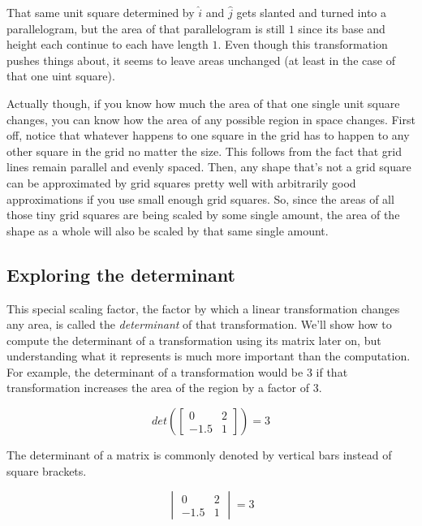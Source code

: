 That same unit square determined by $\hat{i}$ and $\hat{j}$ gets slanted and
turned into a parallelogram, but the area of that parallelogram is still $1$
since its base and height each continue to each have length $1$. Even though
this transformation pushes things about, it seems to leave areas unchanged (at
least in the case of that one uint square).

Actually though, if you know how much the area of that one single unit square
changes, you can know how the area of any possible region in space changes.
First off, notice that whatever happens to one square in the grid has to happen
to any other square in the grid no matter the size. This follows from the fact
that grid lines remain parallel and evenly spaced. Then, any shape that's not a
grid square can be approximated by grid squares pretty well with arbitrarily
good approximations if you use small enough grid squares. So, since the areas of
all those tiny grid squares are being scaled by some single amount, the area of
the shape as a whole will also be scaled by that same single amount.

\subsection{Exploring the determinant}

This special scaling factor, the factor by which a linear transformation changes
any area, is called the \textit{determinant} of that transformation. We'll show
how to compute the determinant of a transformation using its matrix later on,
but understanding what it represents is much more important than the
computation. For example, the determinant of a transformation would be $3$ if
that transformation increases the area of the region by a factor of $3$.

\begin{equation*}
  det\left(\begin{bmatrix}
    0 & 2 \\
    -1.5 & 1
  \end{bmatrix}\right) = 3
\end{equation*}

The determinant of a matrix is commonly denoted by vertical bars instead of
square brackets.

\begin{equation*}
  \begin{vmatrix}
    0 & 2 \\
    -1.5 & 1
  \end{vmatrix} = 3
\end{equation*}

